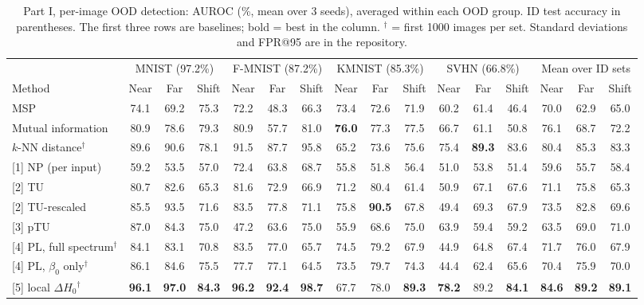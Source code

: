 \begin{table}[t]
\centering
\setlength{\tabcolsep}{3pt}\scriptsize
\begin{tabular}{@{}lccccccccccccccc@{}}
\toprule
 & \multicolumn{3}{c}{MNIST (97.2\%)} & \multicolumn{3}{c}{F-MNIST (87.2\%)} & \multicolumn{3}{c}{KMNIST (85.3\%)} & \multicolumn{3}{c}{SVHN (66.8\%)} & \multicolumn{3}{c}{Mean over ID sets} \\
\cmidrule(lr){2-4}\cmidrule(lr){5-7}\cmidrule(lr){8-10}\cmidrule(lr){11-13}\cmidrule(lr){14-16}
Method & Near & Far & Shift & Near & Far & Shift & Near & Far & Shift & Near & Far & Shift & Near & Far & Shift \\
\midrule
{MSP} & 74.1 & 69.2 & 75.3 & 72.2 & 48.3 & 66.3 & 73.4 & 72.6 & 71.9 & 60.2 & 61.4 & 46.4 & 70.0 & 62.9 & 65.0 \\
{Mutual information} & 80.9 & 78.6 & 79.3 & 80.9 & 57.7 & 81.0 & \textbf{76.0} & 77.3 & 77.5 & 66.7 & 61.1 & 50.8 & 76.1 & 68.7 & 72.2 \\
{$k$-NN distance$^\dagger$} & 89.6 & 90.6 & 78.1 & 91.5 & 87.7 & 95.8 & 65.2 & 73.6 & 75.6 & 75.4 & \textbf{89.3} & 83.6 & 80.4 & 85.3 & 83.3 \\
\midrule
{[1] NP (per input)} & 59.2 & 53.5 & 57.0 & 72.4 & 63.8 & 68.7 & 55.8 & 51.8 & 56.4 & 51.0 & 53.8 & 51.4 & 59.6 & 55.7 & 58.4 \\
{[2] TU} & 80.7 & 82.6 & 65.3 & 81.6 & 72.9 & 66.9 & 71.2 & 80.4 & 61.4 & 50.9 & 67.1 & 67.6 & 71.1 & 75.8 & 65.3 \\
{[2] TU-rescaled} & 85.5 & 93.5 & 71.6 & 83.5 & 77.8 & 71.1 & 75.8 & \textbf{90.5} & 67.8 & 49.4 & 69.3 & 67.9 & 73.5 & 82.8 & 69.6 \\
{[3] pTU} & 87.0 & 84.3 & 75.0 & 47.2 & 63.6 & 75.0 & 55.9 & 68.6 & 75.0 & 63.9 & 59.4 & 59.2 & 63.5 & 69.0 & 71.0 \\
{[4] PL, full spectrum$^\dagger$} & 84.1 & 83.1 & 70.8 & 83.5 & 77.0 & 65.7 & 74.5 & 79.2 & 67.9 & 44.9 & 64.8 & 67.4 & 71.7 & 76.0 & 67.9 \\
{[4] PL, $\beta_0$ only$^\dagger$} & 86.1 & 84.6 & 75.5 & 77.7 & 77.1 & 64.5 & 73.5 & 79.7 & 74.3 & 44.4 & 62.4 & 65.6 & 70.4 & 75.9 & 70.0 \\
{[5] local $\Delta H_0$$^\dagger$} & \textbf{96.1} & \textbf{97.0} & \textbf{84.3} & \textbf{96.2} & \textbf{92.4} & \textbf{98.7} & 67.7 & 78.0 & \textbf{89.3} & \textbf{78.2} & 89.2 & \textbf{84.1} & \textbf{84.6} & \textbf{89.2} & \textbf{89.1} \\
\bottomrule
\end{tabular}
\caption{Part I, per-image OOD detection: AUROC (\%, mean over 3 seeds), averaged within each OOD group. ID test accuracy in parentheses. The first three rows are baselines; bold = best in the column. $^\dagger$ = first 1000 images per set. Standard deviations and FPR@95 are in the repository.}
\label{tab:p1-main}
\end{table}
